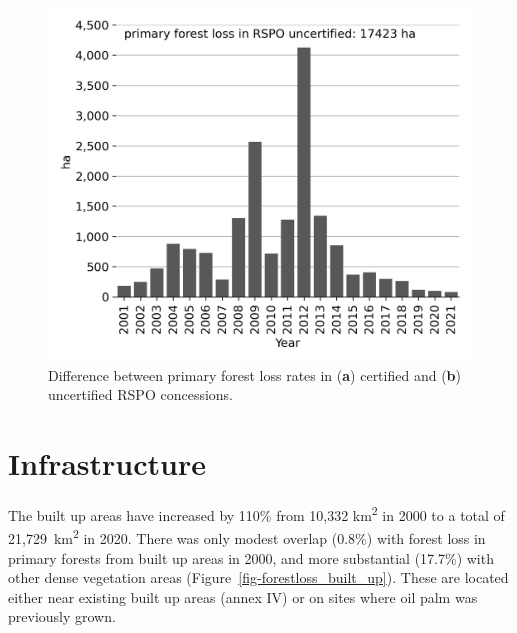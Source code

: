 \documentclass[
  letterpaper,
  DIV=11,
  numbers=noendperiod]{scrreprt}
\begin{document}
\begin{figure}[H]
\begin{minipage}[t]{0.49\linewidth}
{{\includegraphics{text/../code/results/final_plots/RSPO_uncertified_primary_loss.png}

}

}

\end{minipage}%

\caption{\label{fig-RSPO_forestloss}Difference between primary forest
loss rates in (\textbf{a}) certified and (\textbf{b}) uncertified RSPO
concessions.}

\end{figure}

\hypertarget{infrastructure-1}{%
\section{Infrastructure}\label{infrastructure-1}}

The built up areas have increased by 110\% from 10,332
km\textsuperscript{2} in 2000 to a total of 21,729~km\textsuperscript{2}
in 2020. There was only modest overlap (0.8\%) with forest loss in
primary forests from built up areas in 2000, and more substantial
(17.7\%) with other dense vegetation areas
(Figure~\ref{fig-forestloss_built_up}). These are located either near
existing built up areas (annex IV) or on sites where oil palm was
previously grown.
\end{document}
